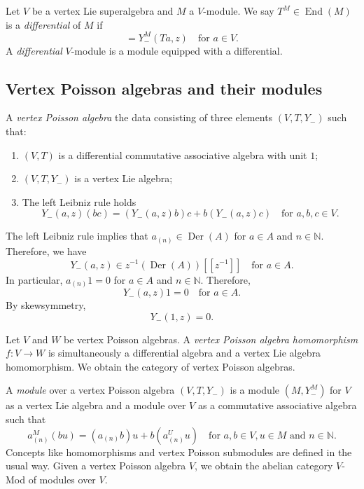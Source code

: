 \documentclass[a4paper, 12pt, reqno]{amsart}
\theoremstyle{remark}
\numberwithin{equation}{subsection}
\DeclareMathOperator{\End}{End}
\DeclareMathOperator{\Der}{Der}
\begin{document}
Let $V$ be a vertex Lie superalgebra and $M$ a $V$-module.
We say $T^M \in \End(M)$ is a \emph{differential} of $M$ if
\begin{equation*}
  [T^M, Y^M_-(a, z)] = Y^M_-(Ta, z) \quad \text{for }a \in V.
\end{equation*}
A \emph{differential} $V$-module is a module equipped with a differential.

\subsection{Vertex Poisson algebras and their modules}
\label{sec:vert-poiss-algeb}

A \emph{vertex Poisson algebra} the data consisting of three elements $(V, T, Y_-)$ such that:
\begin{enumerate}
\item $(V, T)$ is a differential commutative associative algebra with unit $1$;
\item $(V, T, Y_-)$ is a vertex Lie algebra;
\item The left Leibniz rule holds
  \begin{equation*}
    Y_-(a, z)(bc) = (Y_-(a, z)b)c + b(Y_-(a, z)c) \quad \text{for }a, b, c \in V.
  \end{equation*}
\end{enumerate}
The left Leibniz rule implies that $a_{(n)} \in \Der(A)$ for $a \in A$ and $n \in \mathbb{N}$.
Therefore, we have
\begin{equation*}
  Y_-(a, z) \in z^{-1}(\Der(A))[[z^{-1}]] \quad \text{for }a \in A.
\end{equation*}
In particular, $a_{(n)}1 = 0$ for $a \in A$ and $n \in \mathbb{N}$.
Therefore,
\begin{equation*}
  Y_-(a, z)1 = 0 \quad \text{for }a \in A.
\end{equation*}
By skewsymmetry,
\begin{equation*}
  Y_-(1, z) = 0.
\end{equation*}

Let $V$ and $W$ be vertex Poisson algebras.
A \emph{vertex Poisson algebra homomorphism} $f: V \to W$ is simultaneously a differential algebra and a vertex Lie algebra homomorphism.
We obtain the category of vertex Poisson algebras.

A \emph{module} over a vertex Poisson algebra $(V, T, Y_-)$ is a module $(M, Y^M_-)$ for $V$ as a vertex Lie algebra and a module over $V$ as a commutative associative algebra such that
\begin{equation*}
  a^M_{(n)}(bu) = (a_{(n)}b)u + b(a^U_{(n)}u) \quad \text{for }a, b \in V, u \in M\text{ and }n \in \mathbb{N}.
\end{equation*}
Concepts like homomorphisms and vertex Poisson submodules are defined in the usual way.
Given a vertex Poisson algebra $V$, we obtain the abelian category $V$-Mod of modules over $V$.
\end{document}
